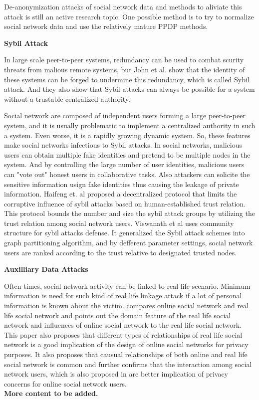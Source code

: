 \documentclass[12pt]{article}
\begin{document}
De-anonymization attacks of social network data and methods to
aliviate this attack is still an active research topic. One possible
method is to try to normalize social network data and use the
relatively mature PPDP methods. 

\textbf{Sybil Attack} 

In large scale peer-to-peer systems, redundancy can be used to combat
scurity threats from malious remote systems, but John et
al. \cite{sybil-attack} show that the identity of these systems can
be forged to undermine this redundancy, which is called Sybil
attack. And they also show that Sybil attacks can always be possible
for a system without a trustable centralized authority. 

Social network are composed of independent users forming a large
peer-to-peer system, and it is usually problematic \cite{sybilguard} to
implement a centralized authority in such a system. Even worse, it is a
rapidly growing dynamic system. So, these features make social
networks infectious to Sybil attacks. In social networks, malicious
users can obtain multiple fake identities and pretend to be multiple
nodes in the system. And by controlling the large number of user
identities, malicious users can "vote out" honest users in
collaborative tasks. Also attackers can solicite the sensitive
information usign fake identities thus causing the leakage of private 
information. Haifeng et. al\cite{sybilguard} proposed a decentralized
protocol that limits the corruptive influence of sybil attacks based
on human-established trust relation. This protocol bounds the number
and size the sybil attack groups by utilizing the trust relation among
social network users. Viswanath et al\cite{sybildefenses} uses
community structure for sybil attacks defense. It generalized the
Sybil attack schemes into graph partitioning algorithm, and by
defferent parameter settings, social network users are ranked
according to the trust relative to designated trusted nodes. 

\textbf{Auxilliary Data Attacks}

Often times, social network activity can be linked to real life
scenario. Minimum information is need for such kind of real life
linkage attack if a lot of personal information is known about the
victim. \cite{real-life-social-network} compares online social network
and real life social network and points out the domain feature of the
real life social network and influences of online social network to
the real life social network. This paper also proposes that different
types of relationships of real life social network is a good
implication of the design of online social networks for privacy
purposes. It also proposes that causual relationships of both online
and real life social network is common and further confirms that the
interaction among social network users, which is also proposed in
\cite{user-interaction-social-link} are better implication of privacy
concerns for online social network users. \\
\textbf{More content to be added.}
\end{document}
